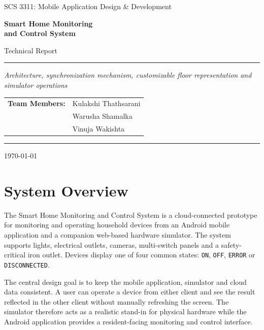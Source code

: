 \documentclass[11pt,a4paper]{article}
\begin{document}
\begin{titlepage}
\centering
\vspace*{1.8cm}
{\Large\color{heading}SCS 3311: Mobile Application Design \& Development\par}
\vspace{1.2cm}
{\Huge\bfseries Smart Home Monitoring\\[0.2cm]and Control System\par}
\vspace{0.45cm}
{\Large Technical Report\par}
\vspace{1.2cm}
\rule{0.8\textwidth}{0.6pt}\par
\vspace{0.7cm}
{\large\textit{Architecture, synchronization mechanism, customizable floor representation and simulator operations}\par}
\vfill
\begin{tabular}{rl}
\textbf{Team Members:} & Kulakshi Thathsarani \\
& Warusha Shamalka \\
& Vinuja Wakishta \\
\end{tabular}
\vfill
\rule{0.8\textwidth}{0.6pt}\par
\vspace{0.4cm}
{\large \today\par}
\end{titlepage}

\section{System Overview}
The Smart Home Monitoring and Control System is a cloud-connected prototype for monitoring and operating household devices from an Android mobile application and a companion web-based hardware simulator. The system supports lights, electrical outlets, cameras, multi-switch panels and a safety-critical iron outlet. Devices display one of four common states: \texttt{ON}, \texttt{OFF}, \texttt{ERROR} or \texttt{DISCONNECTED}.

The central design goal is to keep the mobile application, simulator and cloud data consistent. A user can operate a device from either client and see the result reflected in the other client without manually refreshing the screen. The simulator therefore acts as a realistic stand-in for physical hardware while the Android application provides a resident-facing monitoring and control interface.
\end{document}
